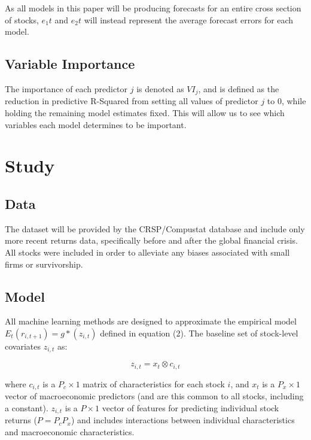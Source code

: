 \documentclass[a4paper, table]{article}
\begin{document}
As all models in this paper will be producing forecasts for an entire cross section of stocks, $e_1t$ and $e_2t$ will instead represent the average forecast errors for each model.

\subsection{Variable Importance}

The importance of each predictor $j$ is denoted as $VI_j$, and is defined as the reduction in predictive R-Squared from setting all values of predictor $j$ to 0, while holding the remaining model estimates fixed. This will allow us to see which variables each model determines to be important. 

\section{Study}

\subsection{Data}

The dataset will be provided by the CRSP/Compustat database and include only more recent returns data, specifically before and after the global financial crisis. All stocks were included in order to alleviate any biases associated with small firms or survivorship.

\subsection{Model}

All machine learning methods are designed to approximate the empirical model \( E_t(r_{i, t+1}) = g*(z_{i,t}) \) defined in equation (2). The baseline set of stock-level covariates \( z_{i,t} \) as:

\begin{equation}
	z_{i,t} = x_t \otimes c_{i,t}
\end{equation}

where \( c_{i,t} \) is a \( P_c \times 1 \) matrix of characteristics for each stock \(i\), and \(x_t\) is a $P_x \times 1$ vector of macroeconomic predictors (and are this common to all stocks, including a constant). $z_{i,t}$ is a $P \times 1$ vector of features for predicting individual stock returns ($P = P_cP_x$) and includes interactions between individual characteristics and macroeconomic characteristics. 
\end{document}
